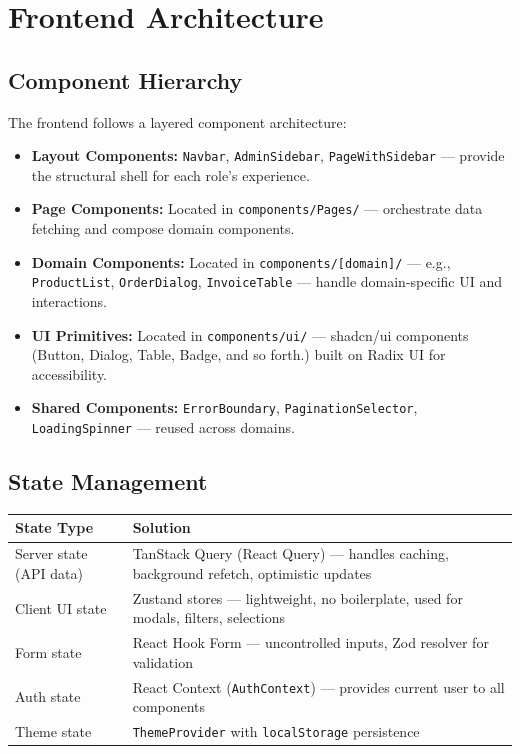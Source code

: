 \documentclass[12pt,a4paper]{report}
\begin{document}
\section{Frontend Architecture}

\subsection{Component Hierarchy}

The frontend follows a layered component architecture:

\begin{itemize}[leftmargin=1.5em]
  \item \textbf{Layout Components:} \texttt{Navbar}, \texttt{AdminSidebar}, \texttt{PageWithSidebar} --- provide the structural shell for each role's experience.
  \item \textbf{Page Components:} Located in \texttt{components/Pages/} --- orchestrate data fetching and compose domain components.
  \item \textbf{Domain Components:} Located in \texttt{components/[domain]/} --- e.g., \texttt{ProductList}, \texttt{OrderDialog}, \texttt{InvoiceTable} --- handle domain-specific UI and interactions.
  \item \textbf{UI Primitives:} Located in \texttt{components/ui/} --- shadcn/ui components (Button, Dialog, Table, Badge, and so forth.) built on Radix UI for accessibility.
  \item \textbf{Shared Components:} \texttt{ErrorBoundary}, \texttt{PaginationSelector}, \texttt{LoadingSpinner} --- reused across domains.
\end{itemize}

\subsection{State Management}

\begin{center}
\begin{tabularx}{\textwidth}{lX}
  \toprule
  \textbf{State Type} & \textbf{Solution} \\
  \midrule
  Server state (API data) & TanStack Query (React Query) --- handles caching, background refetch, optimistic updates \\
  Client UI state         & Zustand stores --- lightweight, no boilerplate, used for modals, filters, selections \\
  Form state              & React Hook Form --- uncontrolled inputs, Zod resolver for validation \\
  Auth state              & React Context (\texttt{AuthContext}) --- provides current user to all components \\
  Theme state             & \texttt{ThemeProvider} with \texttt{localStorage} persistence \\
  \bottomrule
\end{tabularx}
\end{center}
\end{document}
